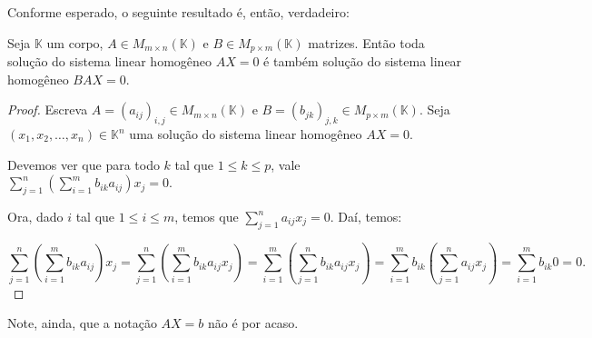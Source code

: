 Conforme esperado, o seguinte resultado é, então, verdadeiro:

\begin{proposition}
    Seja $\mathbb K$ um corpo, $A\in M_{m \times n}(\mathbb K)$ e $B\in M_{p \times m}(\mathbb K)$ matrizes.
    Então toda solução do sistema linear homogêneo $AX=0$ é também solução do sistema linear homogêneo $BAX=0$.
\end{proposition}
\begin{proof}
    Escreva $A=(a_{ij})_{i, j}\in M_{m \times n}(\mathbb K)$ e $B=(b_{jk})_{j, k}\in M_{p \times m}(\mathbb K)$.
    Seja $(x_1, x_2, \ldots, x_n)\in \mathbb K^n$ uma solução do sistema linear homogêneo $AX=0$.

    Devemos ver que para todo $k$ tal que $1\leq k \leq p$, vale $\sum_{j=1}^n\left(\sum_{i=1}^m b_{ik} a_{ij} \right)x_j=0$.

    Ora, dado $i$ tal que $1\leq i \leq m$, temos que $\sum_{j=1}^n a_{ij} x_j=0$.
    Daí, temos:
    
    \begin{equation*}
    \sum_{j=1}^n\left(\sum_{i=1}^m b_{ik} a_{ij} \right)x_j=\sum_{j=1}^n\left(\sum_{i=1}^m b_{ik} a_{ij}x_j \right)=\sum_{i=1}^m\left(\sum_{j=1}^n b_{ik} a_{ij}x_j \right)=\sum_{i=1}^m b_{ik}\left(\sum_{j=1}^n a_{ij}x_j \right)=\sum_{i=1}^m b_{ik}0=0.
    \end{equation*}
\end{proof}

Note, ainda, que a notação $AX=b$ não é por acaso.

